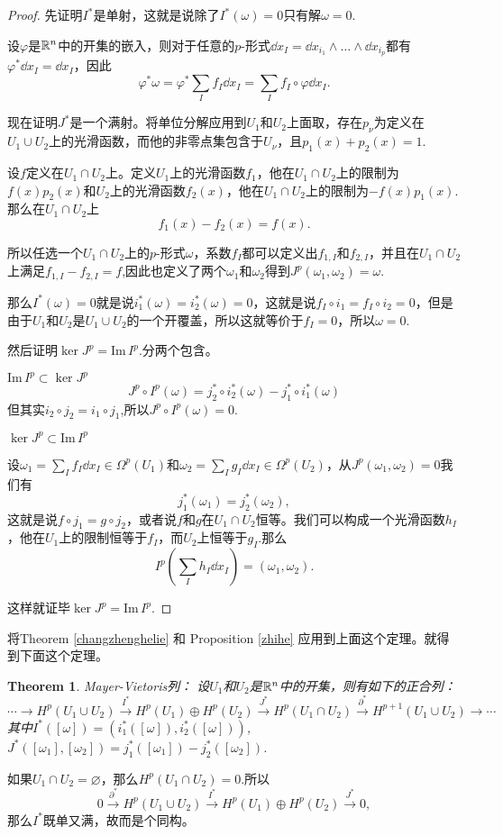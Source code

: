 \documentclass[11pt]{extbook}
\theoremstyle{plain}%
\newtheorem{theo}{Theorem}[section]%
\begin{document}
\begin{proof}
先证明$I^*$是单射，这就是说除了$I^*(\omega)=0$只有解$\omega=0$.

设$\varphi$是$\mathbb{R}^n$中的开集的嵌入，则对于任意的$p$-形式$\dd x_I=\dd x_{i_1}\wedge\dots\wedge\dd x_{i_p}$都有$\varphi^* \dd x_I =\dd x_I$，因此
\[
\varphi^*\omega=\varphi^*\sum_If_I\dd x_I=\sum_If_I\circ\varphi \dd x_I.
\]

现在证明$J^*$是一个满射。将单位分解应用到$U_1$和$U_2$上面取，存在$p_\nu$为定义在$U_1\cup U_2$上的光滑函数，而他的非零点集包含于$U_\nu$，且$p_1(x)+p_2(x)=1$.

设$f$定义在$U_1\cap U_2$上。定义$U_1$上的光滑函数$f_1$，他在$U_1\cap U_2$上的限制为$f(x)p_2(x)$和$U_2$上的光滑函数$f_2(x)$，他在$U_1\cap U_2$上的限制为$-f(x)p_1(x)$.那么在$U_1\cap U_2$上
\[
f_1(x)-f_2(x)=f(x).
\]

所以任选一个$U_1\cap U_2$上的$p$-形式$\omega$，系数$f_I$都可以定义出$f_{1,I}$和$f_{2,I}$，并且在$U_1\cap U_2$上满足$f_{1,I}-f_{2,I}=f$,因此也定义了两个$\omega_1$和$\omega_2$得到$J^p(\omega_1,\omega_2)=\omega$.

那么$I^*(\omega)=0$就是说$i_1^*(\omega)=i_2^*(\omega)=0$，这就是说$f_I\circ i_1=f_I\circ i_2=0$，但是由于$U_1$和$U_2$是$U_1\cup U_2$的一个开覆盖，所以这就等价于$f_I=0$，所以$\omega=0$.

然后证明$\ker J^p=\mathrm{Im}\, I^p$.分两个包含。

 $\mathrm{Im}\, I^p\subset \ker J^p$
\[
J^p\circ I^p(\omega)=j_2^*\circ i_2^*(\omega)-j_1^*\circ i_1^*(\omega)
\]
但其实$i_2\circ j_2=i_1\circ j_1$,所以$J^p\circ I^p(\omega)=0$.

 $\ker J^p\subset \mathrm{Im}\, I^p$

设$\omega_1=\sum_I f_I \dd x_I\in \Omega^p(U_1)$和$\omega_2=\sum_I g_I \dd x_I\in \Omega^p(U_2)$，从$J^p(\omega_1,\omega_2)=0$我们有
\[
j_1^*(\omega_1)=j_2^*(\omega_2),
\]
这就是说$f\circ j_1=g\circ j_2$，或者说$f$和$g$在$U_1\cap U_2$恒等。我们可以构成一个光滑函数$h_I$，他在$U_1$上的限制恒等于$f_I$，而$U_2$上恒等于$g_I$.那么
\[
I^p\left(\sum_Ih_I\dd x_I\right)=(\omega_1,\omega_2).
\]

这样就证毕$\ker J^p=\mathrm{Im}\, I^p$.
\end{proof}
将Theorem \ref{changzhenghelie} 和 Proposition \ref{zhihe} 应用到上面这个定理。就得到下面这个定理。
\begin{theo}Mayer-Vietoris列：
设$U_1$和$U_2$是$\mathbb{R}^n$中的开集，则有如下的正合列：
\[
\cdots\to H^p(U_1\cup U_2)\xrightarrow{I^*}H^p(U_1)\oplus H^p(U_2)\xrightarrow{J^*}H^p(U_1\cap U_2)\xrightarrow{\partial^*}H^{p+1}(U_1\cup U_2)
\to \cdots
\]
其中$I^*([\omega])=(i_1^*([\omega]),i_2^*([\omega]))$,$J^*([\omega_1],[\omega_2])=j_1^*([\omega_1])-j_2^*([\omega_2])$.
\end{theo}
如果$U_1\cap U_2=\varnothing$，那么$H^p(U_1\cap U_2)=0$.所以
\[
0\xrightarrow{\partial^*} H^p(U_1\cup U_2)\xrightarrow{I^*}H^p(U_1)\oplus H^p(U_2)\xrightarrow{J^*}0,
\]
那么$I^*$既单又满，故而是个同构。
\end{document}
